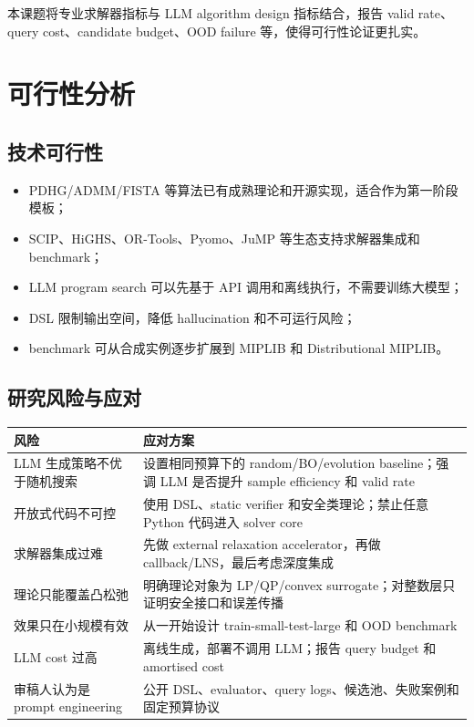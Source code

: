 \documentclass[UTF8,a4paper,12pt,fontset=fandol]{ctexart}
\begin{document}
本课题将专业求解器指标与 LLM algorithm design 指标结合，报告 valid rate、query cost、candidate budget、OOD failure 等，使得可行性论证更扎实。

\section{可行性分析}

\subsection{技术可行性}

\begin{itemize}[leftmargin=2em]
    \item PDHG/ADMM/FISTA 等算法已有成熟理论和开源实现，适合作为第一阶段模板；
    \item SCIP、HiGHS、OR-Tools、Pyomo、JuMP 等生态支持求解器集成和 benchmark；
    \item LLM program search 可以先基于 API 调用和离线执行，不需要训练大模型；
    \item DSL 限制输出空间，降低 hallucination 和不可运行风险；
    \item benchmark 可从合成实例逐步扩展到 MIPLIB 和 Distributional MIPLIB。
\end{itemize}

\subsection{研究风险与应对}

\begin{longtable}{p{4cm}p{8.5cm}}
\toprule
风险 & 应对方案 \\
\midrule
LLM 生成策略不优于随机搜索 & 设置相同预算下的 random/BO/evolution baseline；强调 LLM 是否提升 sample efficiency 和 valid rate \\
开放式代码不可控 & 使用 DSL、static verifier 和安全类理论；禁止任意 Python 代码进入 solver core \\
求解器集成过难 & 先做 external relaxation accelerator，再做 callback/LNS，最后考虑深度集成 \\
理论只能覆盖凸松弛 & 明确理论对象为 LP/QP/convex surrogate；对整数层只证明安全接口和误差传播 \\
效果只在小规模有效 & 从一开始设计 train-small-test-large 和 OOD benchmark \\
LLM cost 过高 & 离线生成，部署不调用 LLM；报告 query budget 和 amortised cost \\
审稿人认为是 prompt engineering & 公开 DSL、evaluator、query logs、候选池、失败案例和固定预算协议 \\
\bottomrule
\end{longtable}
\end{document}
